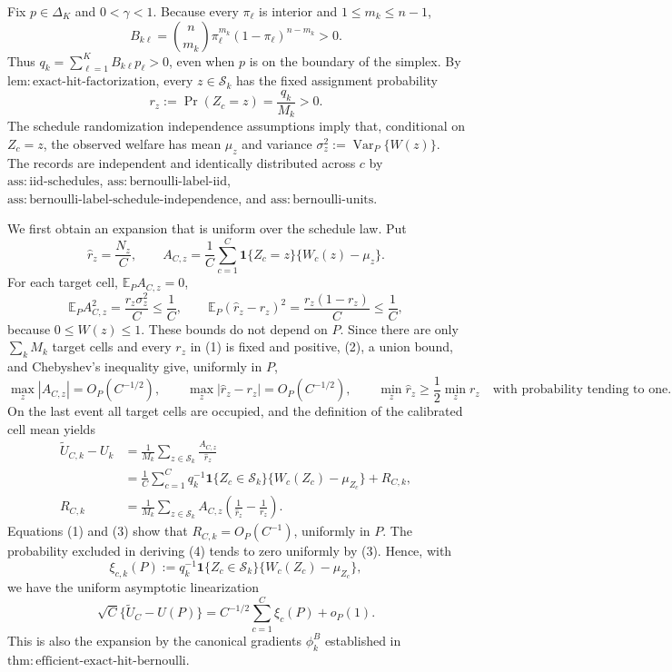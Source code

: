 Fix \(p\in\Delta_K\) and \(0<\gamma<1\).  Because every \(\pi_\ell\) is interior and \(1\leq m_k\leq n-1\),
\[
B_{k\ell}=\binom{n}{m_k}\pi_\ell^{m_k}(1-\pi_\ell)^{n-m_k}>0.
\]
Thus \(q_k=\sum_{\ell=1}^K B_{k\ell}p_\ell>0\), even when \(p\) is on the boundary of the simplex.  By \(\mathrm{lem{:}exact\mbox{-}hit\mbox{-}factorization}\), every \(z\in\mathcal S_k\) has the fixed assignment probability
\[
r_z:=\Pr(Z_c=z)=\frac{q_k}{M_k}>0. \tag{1}
\]
The schedule randomization independence assumptions imply that, conditional on \(Z_c=z\), the observed welfare has mean \(\mu_z\) and variance
\(\sigma_z^2:=\operatorname{Var}_P\{W(z)\}\).  The records are independent and identically distributed across \(c\) by \(\mathrm{ass{:}iid\mbox{-}schedules}\), \(\mathrm{ass{:}bernoulli\mbox{-}label\mbox{-}iid}\), \(\mathrm{ass{:}bernoulli\mbox{-}label\mbox{-}schedule\mbox{-}independence}\), and \(\mathrm{ass{:}bernoulli\mbox{-}units}\).

We first obtain an expansion that is uniform over the schedule law.  Put
\[
\widehat r_z=\frac{N_z}{C},\qquad
A_{C,z}=\frac1C\sum_{c=1}^C\mathbf 1\{Z_c=z\}\{W_c(z)-\mu_z\}.
\]
For each target cell, \(\mathbb E_P A_{C,z}=0\),
\[
\mathbb E_P A_{C,z}^2
=\frac{r_z\sigma_z^2}{C}\leq\frac1C,
\qquad
\mathbb E_P(\widehat r_z-r_z)^2
=\frac{r_z(1-r_z)}C\leq\frac1C, \tag{2}
\]
because \(0\leq W(z)\leq1\).  These bounds do not depend on \(P\).  Since there are only \(\sum_kM_k\) target cells and every \(r_z\) in (1) is fixed and positive, (2), a union bound, and Chebyshev's inequality give, uniformly in \(P\),
\[
\max_z|A_{C,z}|=O_P(C^{-1/2}),\qquad
\max_z|\widehat r_z-r_z|=O_P(C^{-1/2}),\qquad
\min_z\widehat r_z\geq\frac12\min_zr_z
\quad\text{with probability tending to one}. \tag{3}
\]
On the last event all target cells are occupied, and the definition of the calibrated cell mean yields
\[
\begin{aligned}
\widetilde U_{C,k}-U_k
&=\frac1{M_k}\sum_{z\in\mathcal S_k}\frac{A_{C,z}}{\widehat r_z}\\
&=\frac1C\sum_{c=1}^C
 q_k^{-1}\mathbf 1\{Z_c\in\mathcal S_k\}
 \{W_c(Z_c)-\mu_{Z_c}\}+R_{C,k},\\
R_{C,k}
&=\frac1{M_k}\sum_{z\in\mathcal S_k}
A_{C,z}\left(\frac1{\widehat r_z}-\frac1{r_z}\right).
\end{aligned} \tag{4}
\]
Equations (1) and (3) show that \(R_{C,k}=O_P(C^{-1})\), uniformly in \(P\).  The probability excluded in deriving (4) tends to zero uniformly by (3).  Hence, with
\[
\xi_{c,k}(P):=q_k^{-1}\mathbf 1\{Z_c\in\mathcal S_k\}
\{W_c(Z_c)-\mu_{Z_c}\},
\]
we have the uniform asymptotic linearization
\[
\sqrt C\{\widetilde U_C-U(P)\}
=C^{-1/2}\sum_{c=1}^C\xi_c(P)+o_P(1). \tag{5}
\]
This is also the expansion by the canonical gradients \(\phi_k^B\) established in \(\mathrm{thm{:}efficient\mbox{-}exact\mbox{-}hit\mbox{-}bernoulli}\).

